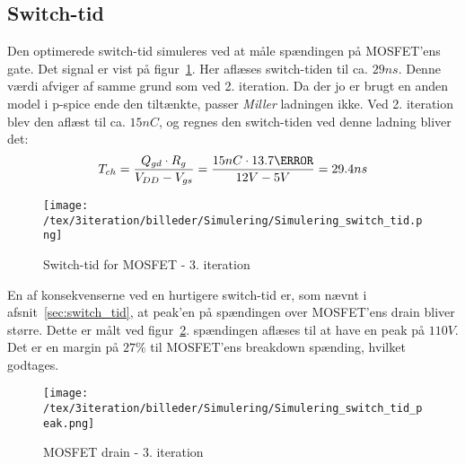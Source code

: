 
\subsection{Switch-tid}
Den optimerede switch-tid simuleres ved at måle spændingen på MOSFET'ens gate. Det signal er vist på figur~\ref{fig:switch_tid_3}. Her aflæses switch-tiden til ca. $29ns$. Denne værdi afviger af samme grund som ved 2. iteration. Da der jo er brugt en anden model i p-spice ende den tiltænkte, passer \textit{Miller} ladningen ikke. Ved 2. iteration blev den aflæst til ca. $15nC$, og regnes den switch-tiden ved denne ladning bliver det:
\begin{equation} 
T_{ch} = \frac{Q_{gd} \cdot R_{g}}{V_{DD}-V_{gs}} = \frac{15nC \cdot 13.7\ohm}{12V-5V} = 29.4ns
\end{equation}

\begin{figure}[H]
	\center
	\texttt{[image: /tex/3iteration/billeder/Simulering/Simulering\_switch\_tid.png]}
	\caption{Switch-tid for MOSFET - 3. iteration}
	\label{fig:switch_tid_3}
\end{figure}

En af konsekvenserne ved en hurtigere switch-tid er, som nævnt i afsnit~\ref{sec:switch_tid}, at peak'en på spændingen over MOSFET'ens drain bliver større. Dette er målt ved figur~\ref{fig:switch_tid_peak}. spændingen aflæses til at have en peak på $110V$. Det er en margin på $27\percent$ til MOSFET'ens breakdown spænding, hvilket godtages. 

\begin{figure}[H]
	\center
	\texttt{[image: /tex/3iteration/billeder/Simulering/Simulering\_switch\_tid\_peak.png]}
	\caption{MOSFET drain - 3. iteration}
	\label{fig:switch_tid_peak}
\end{figure}